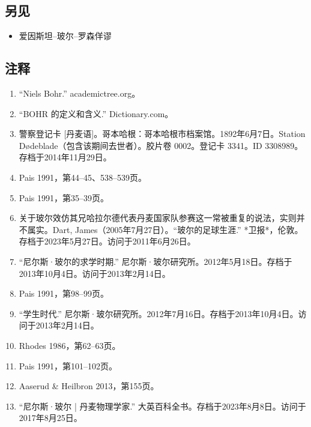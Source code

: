 \subsection{另见}
\begin{itemize}
\item 爱因斯坦–玻尔–罗森佯谬
\end{itemize}
\subsection{注释}
\begin{enumerate}
\item “Niels Bohr.” academictree.org。
\item “BOHR 的定义和含义.” Dictionary.com。
\item 警察登记卡 [丹麦语]。哥本哈根：哥本哈根市档案馆。1892年6月7日。Station Dødeblade（包含该期间去世者）。胶片卷 0002。登记卡 3341。ID 3308989。存档于2014年11月29日。
\item Pais 1991，第44–45、538–539页。
\item Pais 1991，第35–39页。
\item 关于玻尔效仿其兄哈拉尔德代表丹麦国家队参赛这一常被重复的说法，实则并不属实。Dart, James（2005年7月27日）。“玻尔的足球生涯.” *卫报*，伦敦。存档于2023年5月27日。访问于2011年6月26日。
\item “尼尔斯·玻尔的求学时期.” 尼尔斯·玻尔研究所。2012年5月18日。存档于2013年10月4日。访问于2013年2月14日。
\item Pais 1991，第98–99页。
\item “学生时代.” 尼尔斯·玻尔研究所。2012年7月16日。存档于2013年10月4日。访问于2013年2月14日。
\item Rhodes 1986，第62–63页。
\item Pais 1991，第101–102页。
\item Aaserud & Heilbron 2013，第155页。
\item “尼尔斯·玻尔 | 丹麦物理学家.” 大英百科全书。存档于2023年8月8日。访问于2017年8月25日。

\end{enumerate}